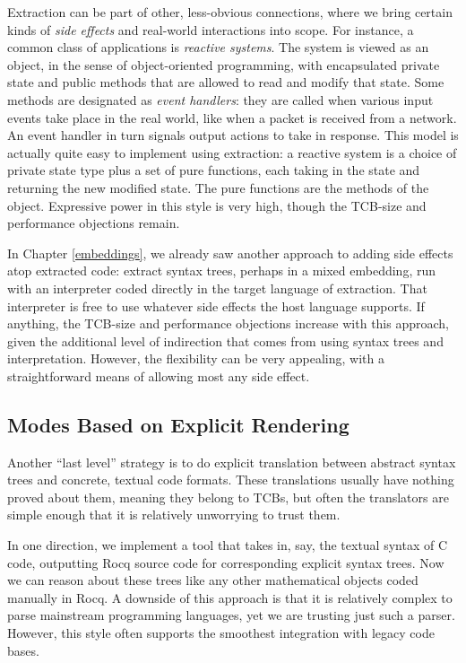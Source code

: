 \documentclass{amsbook}
\theoremstyle{definition}
\theoremstyle{remark}
\numberwithin{section}{chapter}
\numberwithin{equation}{chapter}
\begin{document}
Extraction can be part of other, less-obvious connections, where we bring certain kinds of \emph{side effects} and real-world interactions into scope.
For instance, a common class of applications is \emph{reactive systems}.
The system is viewed as an object, in the sense of object-oriented programming, with encapsulated private state and public methods that are allowed to read and modify that state.
Some methods are designated as \emph{event handlers}: they are called when various input events take place in the real world, like when a packet is received from a network.
An event handler in turn signals output actions to take in response.
This model is actually quite easy to implement using extraction: a reactive system is a choice of private state type plus a set of pure functions, each taking in the state and returning the new modified state.
The pure functions are the methods of the object.
Expressive power in this style is very high, though the TCB-size and performance objections remain.

In Chapter \ref{embeddings}, we already saw another approach to adding side effects atop extracted code: extract syntax trees, perhaps in a mixed embedding, run with an interpreter coded directly in the target language of extraction.
That interpreter is free to use whatever side effects the host language supports.
If anything, the TCB-size and performance objections increase with this approach, given the additional level of indirection that comes from using syntax trees and interpretation.
However, the flexibility can be very appealing, with a straightforward means of allowing most any side effect.

\subsection{Modes Based on Explicit Rendering}

Another ``last level'' strategy is to do explicit translation between abstract syntax trees and concrete, textual code formats.
These translations usually have nothing proved about them, meaning they belong to TCBs, but often the translators are simple enough that it is relatively unworrying to trust them.

In one direction, we implement a tool that takes in, say, the textual syntax of C code, outputting Rocq source code for corresponding explicit syntax trees.
Now we can reason about these trees like any other mathematical objects coded manually in Rocq.
A downside of this approach is that it is relatively complex to parse mainstream programming languages, yet we are trusting just such a parser.
However, this style often supports the smoothest integration with legacy code bases.
\end{document}
